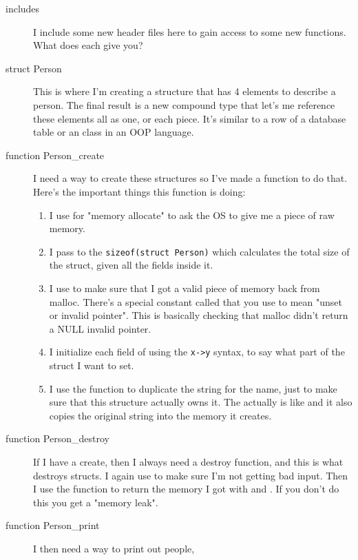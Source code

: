 \begin{description}
\item [includes] I include some new header files here to gain
    access to some new functions.  What does each give you?
\item [struct Person] This is where I'm creating a structure that
    has 4 elements to describe a person.  The final result is a
    new compound type that let's me reference these elements all
    as one, or each piece.  It's similar to a row of a database
    table or an class in an OOP language.
\item[function Person\_create] I need a way to create these structures
    so I've made a function to do that.  Here's the important 
    things this function is doing:
    \begin{enumerate}
    \item I use  for "memory allocate" to ask the OS
        to give me a piece of raw memory.
    \item I pass to  the \verb|sizeof(struct Person)| 
        which calculates the total size of the struct, given all the 
        fields inside it.
    \item I use  to make sure that I got a valid 
        piece of memory back from malloc.  There's a special constant called
     that you use to mean "unset or invalid pointer".  This
     is basically checking that malloc didn't return a
        NULL invalid pointer.
    \item I initialize each field of  using the
        \verb|x->y| syntax, to say what part of the struct I want to set.
    \item I use the  function to duplicate the string 
        for the name, just to make sure that this structure actually owns
        it.  The  actually is like  and it also
        copies the original string into the memory it creates.
    \end{enumerate}
\item[function Person\_destroy] If I have a create, then I always need
    a destroy function, and this is what destroys  structs.
    I again use  to make sure I'm not getting bad input.
    Then I use the function  to return the memory I got with
     and .  If you don't do this you get
    a "memory leak".
\item[function Person\_print] I then need a way to print out people,

\end{description}
